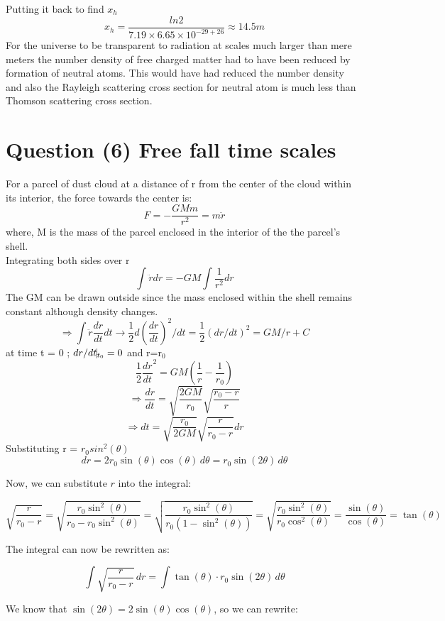 \documentclass[11pt]{article}
\begin{document}
		Putting it back to find $x_h$
		\[
			\boxed{x_h = \frac{ln2}{7.19\times6.65\times 10^{-29+26}} \approx 14.5 m} 
		\]
		For the universe to be transparent to radiation at scales much larger than mere meters the number density of free charged matter had to have been reduced by formation of neutral atoms. This would have had reduced the number density and also the Rayleigh scattering cross section for neutral atom is much less than Thomson scattering cross section.
		
		\section{\color{teal} Question (6) Free fall time scales}
		
		For a parcel of dust cloud at a distance of r from the center of the cloud within its interior, the force towards the center is:
		\[
			F = -\frac{GM m}{r^2} = m\ddot{r}
		\] 
		where, M is the mass of the parcel enclosed in the interior of the the parcel's shell. \\
		Integrating both sides over r
		\[
			\int  \ddot{r} dr = -GM\int \frac{1}{r^2} dr
		\]
		The GM can be drawn outside since the mass enclosed within the shell remains constant although density changes.
		\[
			\Rightarrow \int  \ddot{r} \frac{dr}{dt}dt \rightarrow \frac{1}{2} d(\frac{dr}{dt})^2/dt = \frac{1}{2} (dr/dt)^2  = GM/r + C
		\]		
		at time t = 0 ; $dr/dt\vline_{t_0} = 0$ and r=r$_0$
		\[
			\frac{1}{2} \frac{dr}{dt}^2 = GM(\frac{1}{r}-\frac{1}{r_0})
		\]
		\[
			\Rightarrow \frac{dr}{dt} = \sqrt{\frac{2GM}{r_0}}\sqrt{\frac{r_0-r}{r}}
		\]
		\[
			\Rightarrow dt = \sqrt{\frac{r_0}{2GM}} \sqrt{\frac{r}{r_0-r}}dr
		\]
		Substituting r = $r_0sin^2(\theta)$
		\[
		dr = 2r_0 \sin(\theta) \cos(\theta) \, d\theta = r_0 \sin(2\theta) \, d\theta
		\]
			
		Now, we can substitute \( r \) into the integral:
		
		\[
		\sqrt{\frac{r}{r_0 - r}} = \sqrt{\frac{r_0 \sin^2(\theta)}{r_0 - r_0 \sin^2(\theta)}} = \sqrt{\frac{r_0 \sin^2(\theta)}{r_0(1 - \sin^2(\theta))}} = \sqrt{\frac{r_0 \sin^2(\theta)}{r_0 \cos^2(\theta)}} = \frac{\sin(\theta)}{\cos(\theta)} = \tan(\theta)
		\]
		
		
		The integral can now be rewritten as:
		
		\[
		\int \sqrt{\frac{r}{r_0 - r}} \, dr = \int \tan(\theta) \cdot r_0 \sin(2\theta) \, d\theta
		\]
		
		We know that \( \sin(2\theta) = 2 \sin(\theta) \cos(\theta) \), so we can rewrite:
		
\end{document}
